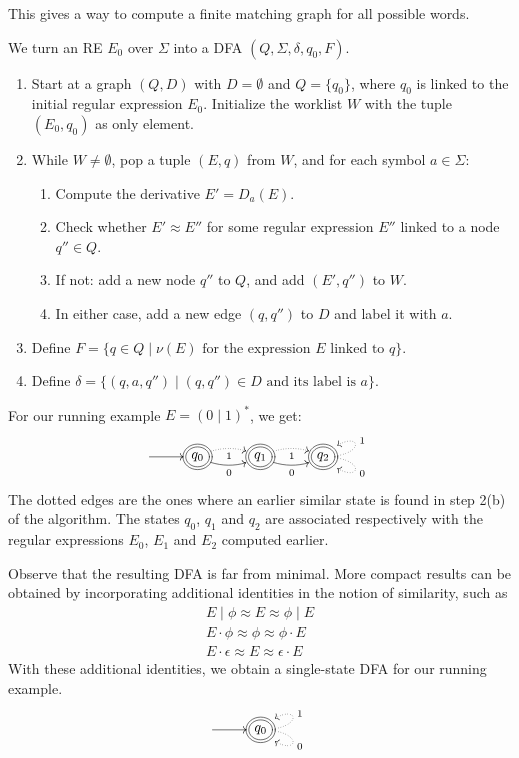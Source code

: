 This gives a way to compute a finite matching graph for all possible words.
\begin{code}[RE to DFA]
We turn an RE $E_0$ over $\Sigma$ into a DFA $(Q,\Sigma,\delta,q_0,F)$.
\begin{enumerate}
	\item Start at a graph $(Q,D)$ with $D = \emptyset$ and $Q = \{q_0\}$, where $q_0$ is linked to the initial regular expression $E_0$. Initialize the worklist $W$ with the tuple $(E_0, q_0)$ as only element.
	\newpage

	\item While $W\neq \emptyset$, pop a tuple $(E, q)$ from $W$, and for each symbol $a\in \Sigma$:
      \begin{enumerate}
	      \item Compute the derivative $E' = D_a(E)$.
	      \item Check whether $E' \approx E''$ for some regular expression $E''$
	            linked to a node $q''\in Q$.
		   \item If not: add a new node $q''$ to $Q$, and add $(E',q'')$ to $W$.
			\item In either case, add a new edge $(q,q'')$ to $D$ and label it with $a$.
      \end{enumerate}
	\item Define $F = \{q\in Q\mid \text{$\nu(E)$ for the expression $E$ linked to $q$}\}$.
	\item Define $\delta = \{(q,a,q'') \mid (q,q'')\in D\text{ and its label is $a$}\}$.
\end{enumerate}
\end{code}

For our running example $E = (0 \mid 1)^*$, we get:
\begin{equation*}
\atm\xymatrix{
*{} \ar[r] & 
\accept{q_0} \ar@/_/[r]_0\ar@{.>}@/^/[r]_1 &
\accept{q_1} \ar@/_/[r]_0\ar@{.>}@/^/[r]_1 & 
\accept{q_2} \ar@{.>}@(r,dr)^0\ar@{.>}@(r,ur)_1  \\
}
\end{equation*}
The dotted edges are the ones where an earlier similar state is found in step 2(b)
of the algorithm. The states $q_0$, $q_1$ and $q_2$ are associated respectively
with the regular expressions $E_0$, $E_1$ and $E_2$ computed earlier.

Observe that the resulting DFA is far from minimal. More compact results can be obtained
by incorporating additional identities in the notion of similarity, such as
\begin{equation*}
\begin{array}{c}
E \mid \phi \approx E \approx \phi \mid E \\
E \cdot \phi \approx \phi \approx \phi \cdot E \\
E \cdot \epsilon \approx E \approx \epsilon \cdot E
\end{array}
\end{equation*}
With these additional identities, we obtain a single-state DFA for our running example.
\begin{equation*}
\atm\xymatrix{
*{} \ar[r] & 
\accept{q_0} \ar@{.>}@(r,dr)^0\ar@{.>}@(r,ur)_1  \\
}
\end{equation*}

